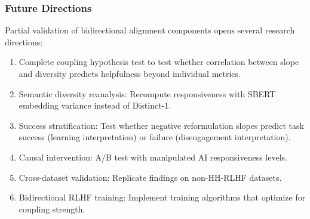 \subsubsection{Future Directions}

Partial validation of bidirectional alignment components opens several research directions:

\begin{enumerate}
\item Complete coupling hypothesis test to test whether correlation between slope and diversity predicts helpfulness beyond individual metrics.
\item Semantic diversity reanalysis: Recompute responsiveness with SBERT embedding variance instead of Distinct-1.
\item Success stratification: Test whether negative reformulation slopes predict task success (learning interpretation) or failure (disengagement interpretation).
\item Causal intervention: A/B test with manipulated AI responsiveness levels.
\item Cross-dataset validation: Replicate findings on non-HH-RLHF datasets.
\item Bidirectional RLHF training: Implement training algorithms that optimize for coupling strength.
\end{enumerate}
